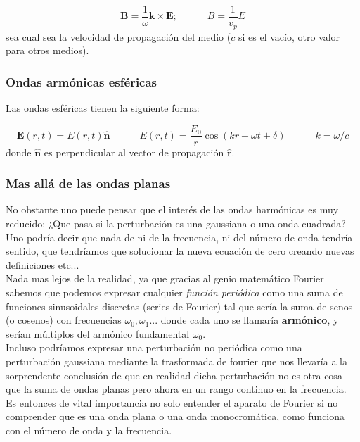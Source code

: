 \documentclass[12pt,a4paper]{article}
\newcommand{\tquad}{\quad \quad \quad}
\newcommand{\Bn}{\mathbf{B}}
\newcommand{\En}{\mathbf{E}}
\newcommand{\kn}{\mathbf{k}}
\newcommand{\hnn}{\hat{\mathbf{n}}}
\newcommand{\hnr}{\hat{\mathbf{r}}}
\numberwithin{equation}{section}
\numberwithin{figure}{section}
\begin{document}
\begin{equation}
\Bn = \dfrac{1}{\omega} \kn \times \En ; \tquad B = \dfrac{1}{v_p} E
\end{equation}
sea cual sea la velocidad de propagación del medio ($c$ si es el vacío, otro valor para otros medios). 


\subsubsection{Ondas armónicas esféricas}


Las ondas esféricas tienen la siguiente forma:

\begin{equation}
\En (r,t) = E(r,t) \hnn \tquad E(r,t) = \dfrac{E_0}{r} \cos (kr-\omega t + \delta) \tquad k = \omega/c
\end{equation}
donde $\hnn$ es perpendicular al vector de propagación $\hnr$.

 

\subsubsection{Mas allá de las ondas planas}

No obstante uno puede pensar que el interés de las ondas harmónicas es muy reducido: ¿Que pasa si la perturbación es una gaussiana o una onda cuadrada? Uno podría decir que nada de ni de la frecuencia, ni del número de onda tendría sentido, que tendríamos que solucionar la nueva ecuación de cero creando nuevas definiciones etc... \\

Nada mas lejos de la realidad, ya que gracias al genio matemático Fourier sabemos que podemos expresar cualquier \textit{función periódica} como una suma de funciones sinusoidales discretas (series de Fourier) tal que sería la suma de senos (o cosenos) con frecuencias $\omega_0,\omega_1...$ donde cada uno se llamaría \textbf{armónico}, y serían múltiplos del armónico fundamental $\omega_0$. \\

Incluso podríamos expresar una perturbación no periódica como una perturbación gaussiana mediante la trasformada de fourier que nos llevaría a la sorprendente conclusión de que en realidad dicha perturbación no es otra cosa que la suma de ondas planas pero ahora en un rango continuo en la frecuencia. \\

Es entonces de vital importancia no solo entender el aparato de Fourier si no comprender que es una onda plana o una onda monocromática, como funciona con el número de onda y la frecuencia.
\end{document}

